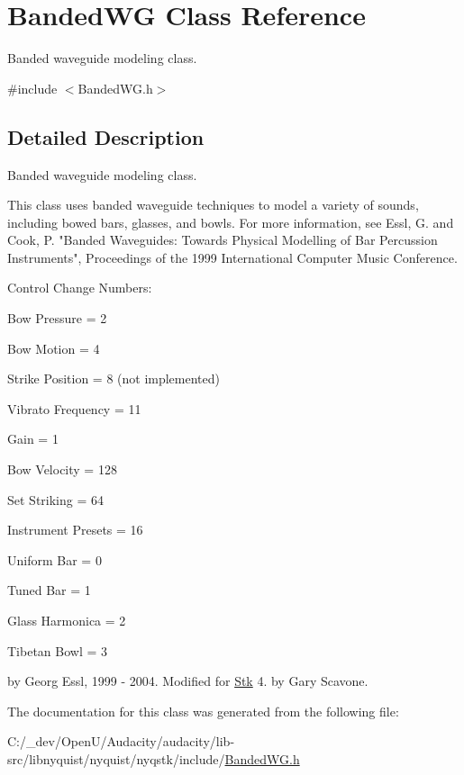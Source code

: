 \hypertarget{class_banded_w_g}{}\section{Banded\+WG Class Reference}
\label{class_banded_w_g}


Banded waveguide modeling class.  




{\ttfamily \#include $<$Banded\+W\+G.\+h$>$}



\subsection{Detailed Description}
Banded waveguide modeling class. 

This class uses banded waveguide techniques to model a variety of sounds, including bowed bars, glasses, and bowls. For more information, see Essl, G. and Cook, P. "Banded Waveguides\+: Towards Physical Modelling of Bar Percussion Instruments", Proceedings of the 1999 International Computer Music Conference.

Control Change Numbers\+:
\begin{DoxyItemize}
\item Bow Pressure = 2
\item Bow Motion = 4
\item Strike Position = 8 (not implemented)
\item Vibrato Frequency = 11
\item Gain = 1
\item Bow Velocity = 128
\item Set Striking = 64
\item Instrument Presets = 16
\begin{DoxyItemize}
\item Uniform Bar = 0
\item Tuned Bar = 1
\item Glass Harmonica = 2
\item Tibetan Bowl = 3
\end{DoxyItemize}
\end{DoxyItemize}

by Georg Essl, 1999 -\/ 2004. Modified for \hyperlink{class_stk}{Stk} 4. by Gary Scavone. 

The documentation for this class was generated from the following file\+:\begin{DoxyCompactItemize}
\item 
C\+:/\+\_\+dev/\+Open\+U/\+Audacity/audacity/lib-\/src/libnyquist/nyquist/nyqstk/include/\hyperlink{_banded_w_g_8h}{Banded\+W\+G.\+h}\end{DoxyCompactItemize}
